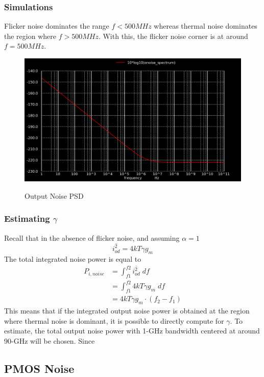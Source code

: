 \documentclass[conference]{IEEEtran}
\begin{document}
\subsubsection{Simulations}
Flicker noise dominates the range $f < 500MHz$ whereas thermal noise dominates the region where $f > 500MHz$. With this, the flicker noise corner is at around $f=500MHz$. 
\begin{figure}[H]
	\centering
	\includegraphics[scale=0.24]{noise-spectrum-35.png}
	\label{fig:noise-spectrum-35} 
	\caption{Output Noise PSD}
\end{figure}
\subsubsection{Estimating $\gamma$} Recall that in the absence of flicker noise, and assuming $\alpha=1$
\begin{equation*}
	\overline{i_{od}^{2}} = 4kT\gamma g_{m}
\end{equation*}
The total integrated noise power is equal to
\begin{align*}
	P_{i,noise} &= \int_{f1}^{f2}\overline{i_{od}^{2}}\;df \\
	&= \int_{f1}^{f2} 4kT\gamma g_{m}\; df \\
	&= 4kT\gamma g_m \cdot (f_2 - f_1)
\end{align*}
This means that if the integrated output noise power is obtained at the region where thermal noise is dominant, it is possible to directly compute for $\gamma$. To estimate, the total output noise power with 1-GHz bandwidth centered at around 90-GHz will be chosen. Since

\subsection{PMOS Noise}
\end{document}
